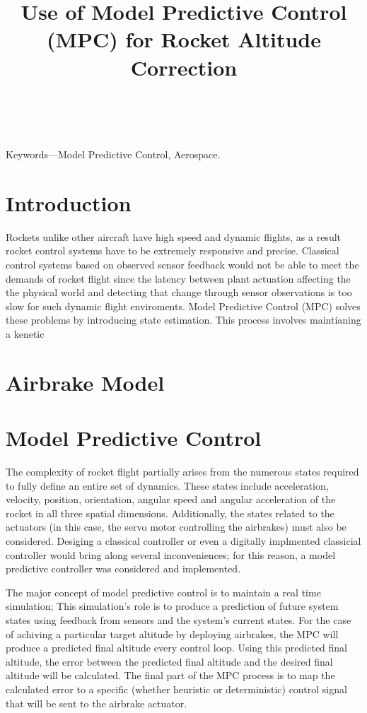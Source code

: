 \documentclass[conference, letterpaper]{IEEEtran}
\title{ Use of Model Predictive Control (MPC) for Rocket Altitude Correction }
\author{ \IEEEauthorblockN{Nikhil Peri, Anthony Lin, Manit Ginoya, Paul Buzuloiu } \
\IEEEauthorblockA{uOttawa Rocketry Team \\ \{nperi104, alin102
mgino015, pbuzu025\}@uottawa.ca} }
\begin{document}
\maketitle
\begin{abstract}
\end{abstract}

Keywords—Model Predictive Control, Aerospace.  \section{Introduction}

Rockets unlike other aircraft have high speed and dynamic flights, as a result
rocket control systems have to be extremely responsive and precise. Classical
control systems based on observed sensor feedback would not be able to meet the
demands of rocket flight since the latency between plant actuation affecting the
the physical world and detecting that change through sensor observations is too
slow for such dynamic flight enviroments. Model Predictive Control (MPC) solves
these problems by introducing state estimation.  This process involves maintianing
a kenetic

\section{Airbrake Model}

\section{Model Predictive Control}

The complexity of rocket flight partially arises from the numerous states
required to fully define an entire set of dynamics. These states include
acceleration, velocity, position, orientation, angular speed and angular
acceleration of the rocket in all three spatial dimensions. Additionally,
the states related to the actuators (in this case, the servo motor controlling
the airbrakes) must also be considered. Desiging a classical controller or even
a digitally implmented classicial controller would bring along several
inconveniences; for this reason, a model predictive controller was considered
and implemented.

The major concept of model predictive control is to maintain a real time
simulation; This simulation's role is to produce a prediction of future system
states using feedback from sensors and the system's current states. For the case
of achiving a particular target altitude by deploying airbrakes, the MPC will
produce a predicted final altitude
every control loop. Using this predicted final altitude, the error between the
predicted final altitude and the desired final altitude will be calculated. The
final part of the MPC process is to map the calculated error to a specific
(whether heuristic or deterministic) control signal that will be sent to the
airbrake actuator.
\end{document}
